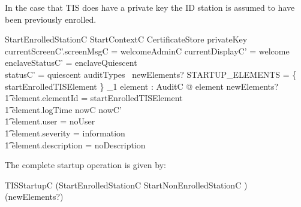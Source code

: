 In the case that TIS does have a private key the ID station is
assumed to have been previously enrolled.

\begin{schema}{StartEnrolledStationC}
        StartContextC
\also
        \Xi CertificateStore
\where 
        privateKey \neq \Nil
\also
        currentScreenC'.screenMsgC = welcomeAdminC
\also
	currentDisplayC' = welcome
\\	enclaveStatusC' = enclaveQuiescent
\\      statusC' = quiescent
\also
        auditTypes~ newElements? \cap STARTUP\_ELEMENTS = 
        \{ startEnrolledTISElement \} 
\also
        \exists_1 element : AuditC @ element \in newElements? 
\\ \t1  \land element.elementId = startEnrolledTISElement
\\ \t1  \land element.logTime \in nowC \upto nowC'
\\ \t1  \land element.user = noUser
\\ \t1  \land element.severity = information
\\ \t1  \land element.description = noDescription
\end{schema}

The complete startup operation is given by:

\begin{zed}
        TISStartupC  (StartEnrolledStationC \lor
        StartNonEnrolledStationC ) \hide (newElements?)
\end{zed}







